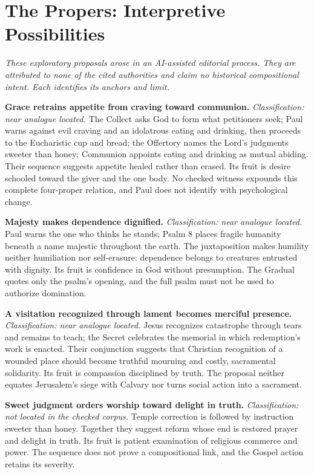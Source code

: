 \sectionguard
\section*{The Propers: Interpretive Possibilities}

\noindent\emph{These exploratory proposals arose in an AI-assisted editorial process. They are attributed to none of the cited authorities and claim no historical compositional intent. Each identifies its anchors and limit.}

\noindent\textbf{Grace retrains appetite from craving toward communion.\enspace{}}
\emph{Classification: near analogue located.} The Collect asks God to form what petitioners seek; Paul warns against evil craving and an idolatrous eating and drinking, then proceeds to the Eucharistic cup and bread; the Offertory names the Lord's judgments sweeter than honey; Communion appoints eating and drinking as mutual abiding. Their sequence suggests appetite healed rather than erased. Its fruit is desire schooled toward the giver and the one body. No checked witness expounds this complete four-proper relation, and Paul does not identify  with psychological change.

\noindent\textbf{Majesty makes dependence dignified.\enspace{}}
\emph{Classification: near analogue located.} Paul warns the one who thinks he stands; Psalm 8 places fragile humanity beneath a name majestic throughout the earth. The juxtaposition makes humility neither humiliation nor self-erasure: dependence belongs to creatures entrusted with dignity. Its fruit is confidence in God without presumption. The Gradual quotes only the psalm's opening, and the full psalm must not be used to authorize domination.

\noindent\textbf{A visitation recognized through lament becomes merciful presence.\enspace{}}
\emph{Classification: near analogue located.} Jesus recognizes catastrophe through tears and remains to teach; the Secret celebrates the memorial in which redemption's work is enacted. Their conjunction suggests that Christian recognition of a wounded place should become truthful mourning and costly, sacramental solidarity. Its fruit is compassion disciplined by truth. The proposal neither equates Jerusalem's siege with Calvary nor turns social action into a sacrament.

\noindent\textbf{Sweet judgment orders worship toward delight in truth.\enspace{}}
\emph{Classification: not located in the checked corpus.} Temple correction is followed by instruction sweeter than honey. Together they suggest reform whose end is restored prayer and delight in truth. Its fruit is patient examination of religious commerce and power. The sequence does not prove a compositional link, and the Gospel action retains its severity.

